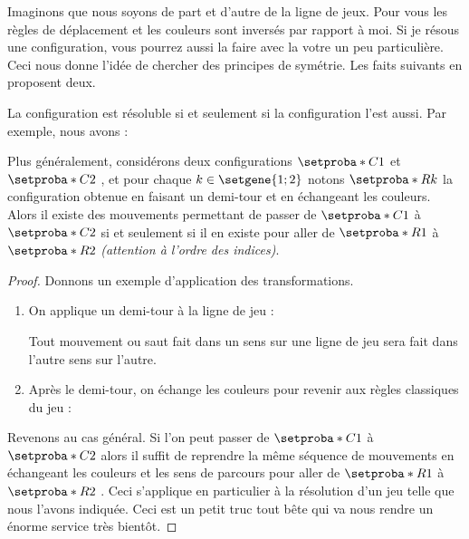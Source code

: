 Imaginons que nous soyons de part et d'autre de la ligne de jeux.
Pour vous les règles de déplacement et les couleurs sont inversés par rapport à moi.
Si je résous une configuration, vous pourrez aussi la faire avec la votre un peu particulière.
Ceci nous donne l'idée de chercher des principes de symétrie. Les faits suivants en proposent deux.



\begin{fact} \label{symmetry-color}
	La configuration  est résoluble si et seulement si la configuration  l'est aussi. 
	Par exemple, nous avons :
	
	
	\medskip
	
	Plus généralement, considérons deux configurations $\setproba*{C}{1}$ et $\setproba*{C}{2}$ , et pour chaque $k \in \setgene{1 ; 2}$ notons $\setproba*{R}{k}$ la configuration obtenue en faisant un demi-tour et en échangeant les couleurs.
	Alors il existe des mouvements permettant de passer de $\setproba*{C}{1}$ à $\setproba*{C}{2}$ si et seulement si il en existe pour aller de $\setproba*{R}{1}$ à $\setproba*{R}{2}$ \emph{(attention à l'ordre des indices)}.  
\end{fact}


\begin{proof}
	Donnons un exemple d'application des transformations.
	\begin{enumerate}
		\item On applique un demi-tour à la ligne de jeu :
		
		\noindent
		Tout mouvement ou saut fait dans un sens sur une ligne de jeu sera fait dans l'autre sens sur l'autre.

		\item Après le demi-tour, on échange les couleurs pour revenir aux règles classiques du jeu :
	\end{enumerate}
	
	Revenons au cas général.
	Si l'on peut passer de $\setproba*{C}{1}$ à $\setproba*{C}{2}$ alors il suffit de reprendre la même séquence de mouvements en échangeant les couleurs et les sens de parcours pour aller de $\setproba*{R}{1}$ à $\setproba*{R}{2}$ .
	Ceci s'applique en particulier à la résolution d'un jeu telle que nous l'avons indiquée. 
	Ceci est un petit truc tout bête qui va nous rendre un énorme service très bientôt.
\end{proof}


